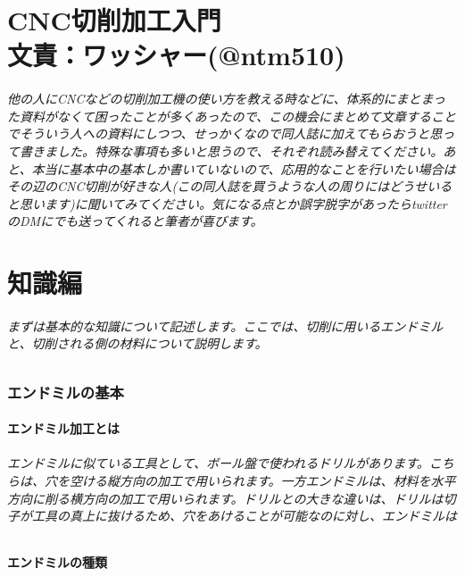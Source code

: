 \documentclass[b5paper, 9pt, twocolumn, titlepage]{jsbook}%
\begin{document}
\part*{CNC切削加工入門\\文責：ワッシャー(@ntm510)}

\paragraph{他の人にCNCなどの切削加工機の使い方を教える時などに、体系的にまとまった資料がなくて困ったことが多くあったので、この機会にまとめて文章することでそういう人への資料にしつつ、せっかくなので同人誌に加えてもらおうと思って書きました。特殊な事項も多いと思うので、それぞれ読み替えてください。あと、本当に基本中の基本しか書いていないので、応用的なことを行いたい場合はその辺のCNC切削が好きな人(この同人誌を買うような人の周りにはどうせいると思います)に聞いてみてください。気になる点とか誤字脱字があったらtwitterのDMにでも送ってくれると筆者が喜びます。}

\part{知識編}

\paragraph{まずは基本的な知識について記述します。ここでは、切削に用いるエンドミルと、切削される側の材料について説明します。}

\section{エンドミルの基本}

\subsection{エンドミル加工とは}

\paragraph{エンドミルに似ている工具として、ボール盤で使われるドリルがあります。こちらは、穴を空ける縦方向の加工で用いられます。一方エンドミルは、材料を水平方向に削る横方向の加工で用いられます。ドリルとの大きな違いは、ドリルは切子が工具の真上に抜けるため、穴をあけることが可能なのに対し、エンドミルは}

\subsection{エンドミルの種類}
\end{document}
